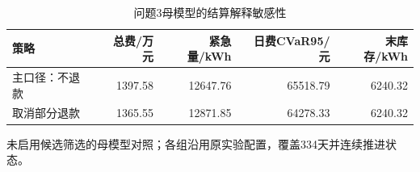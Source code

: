 \begin{table}[htbp]\centering\small
\caption{问题3母模型的结算解释敏感性}
\label{tab:v2_settlement}
\begin{tabularx}{\linewidth}{LRRRR}\toprule
策略 & 总费/万元 & 紧急量/kWh & 日费CVaR95/元 & 末库存/kWh\\\midrule
主口径：不退款 & 1397.58 & 12647.76 & 65518.79 & 6240.32\\
取消部分退款 & 1365.55 & 12871.85 & 64278.33 & 6240.32\\
\bottomrule\end{tabularx}
\par\smallskip\parbox{\linewidth}{\footnotesize 未启用候选筛选的母模型对照；各组沿用原实验配置，覆盖334天并连续推进状态。}
\end{table}
